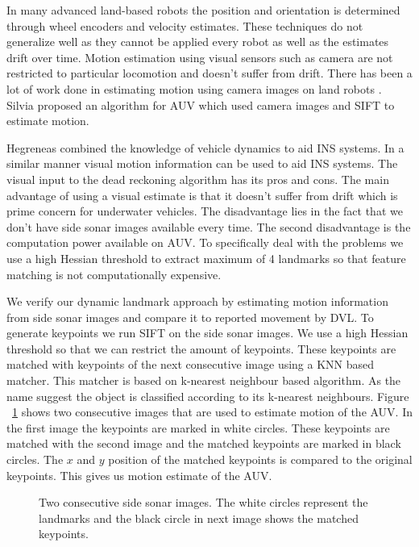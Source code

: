\documentclass[12pt]{dalcsthesis}
\begin{document}
In many advanced land-based robots the position and orientation is determined through wheel encoders and velocity estimates. These techniques do not generalize well as they cannot be applied every robot as well as the estimates drift over time. Motion estimation using visual sensors such as camera are not restricted to particular locomotion and doesn't suffer from drift. There has been a lot of work done in estimating motion using camera images on land robots \cite{barfoot2005online} \cite{scaramuzza2008appearance}. Silvia \cite{Silva} proposed an algorithm for AUV which used camera images and SIFT to estimate motion. 

Hegreneas \cite{hegrenaes2008model} combined the knowledge of vehicle dynamics to aid INS systems. In a similar manner visual motion information can be used to aid INS systems. The visual input to the dead reckoning algorithm has its pros and cons. The main advantage of using a visual estimate is that it doesn't suffer from drift which is prime concern for underwater vehicles. The disadvantage lies in the fact that we don't have side sonar images available every time. The second disadvantage is the computation power available on AUV. To specifically deal with the problems we use a high Hessian threshold to extract maximum of 4 landmarks so that feature matching is not computationally expensive.    

We verify our dynamic landmark approach by estimating motion information from side sonar images and compare it to reported movement by DVL. To generate keypoints we run SIFT on the side sonar images. We use a high Hessian threshold so that we can restrict the amount of keypoints. These keypoints are matched with keypoints of the next consecutive image using a KNN based matcher. This matcher is based on k-nearest neighbour based algorithm. As the name suggest the object is classified according to its k-nearest neighbours.  Figure ~\ref{fig- matched images} shows two consecutive images that are used to estimate motion of the AUV. In the first image the keypoints are marked in white circles. These keypoints are matched with the second image and the matched keypoints are marked in black circles. The $x$ and $y$ position of the matched keypoints is compared to the original keypoints. This gives us motion estimate of the AUV. 

\begin{figure}
  \centering
  \qquad
  \qquad
 \caption{\label{fig- matched images}Two consecutive side sonar images. The white circles represent the landmarks and the black circle in next image shows the matched keypoints.}
\end{figure}
\end{document}
